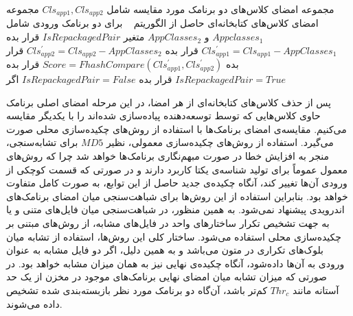  مجموعه امضای کلاس‌های دو برنامک مورد مقایسه شامل $Cls_{app1},Cls_{app2}$ 
 مجموعه امضای کلاس‌های کتابخانه‌ای حاصل از الگوریتم ~ برای دو برنامک ورودی شامل  $Appclasses_1$ و $AppClasses_2$
 متغیر $IsRepackagedPair$ 
 قرار بده $Cls^{'}_{app1} = Cls_{app1} - AppClasses_1$
 قرار بده $Cls^{'}_{app2} = Cls_{app2} - AppClasses_2$
 قرار بده $Score=FhashCompare(Cls^{'}_{app1},Cls^{'}_{app2})$
 قرار بده $IsRepackagedPair=True$
 قرار بده $IsRepackagedPair=False$
‌اگر\\


پس از حذف کلاس‌های کتابخانه‌ای از هر امضا، در این مرحله امضای اصلی برنامک حاوی کلاس‌هایی که توسط توسعه‌دهنده پیاده‌سازی شده‌اند را با یکدیگر مقایسه می‌کنیم. مقایسه‌ی امضای برنامک‌ها با استفاده از روش‌های چکیده‌سازی محلی صورت می‌گیرد. استفاده از روش‌های چکیده‌سازی معمولی، نظیر $MD5$ برای تشابه‌سنجی، منجر به افزایش خطا در صورت مبهم‌نگاری برنامک‌ها خواهد شد چرا که روش‌های معمول عموماً ‌برای تولید شناسه‌ی یکتا کاربرد دارند و در صورتی که قسمت کوچکی از ورودی آن‌ها تغییر کند، آنگاه چکیده‌ی جدید حاصل از این توابع، به صورت کامل متفاوت خواهد بود. بنابراین استفاده از این روش‌ها برای شباهت‌سنجی میان امضای برنامک‌های اندرویدی پیشنهاد نمی‌شود. به همین منظور، در شباهت‌سنجی میان فایل‌های متنی و یا به جهت تشخیص تکرار ساختار‌های واحد در فایل‌های مشابه، از روش‌های مبتنی بر چکیده‌سازی محلی استفاده می‌شود. ساختار کلی این روش‌ها، استفاده از تشابه میان بلوک‌های تکراری در متون می‌باشد و به همین دلیل، اگر دو فایل مشابه به عنوان ورودی به آن‌ها داده‌شود، آنگاه چکیده‌ی نهایی نیز به همان میزان مشابه خواهد بود. در صورتی که میزان تشابه میان امضای نهایی برنامک‌های موجود در مخزن از یک حد آستانه مانند $Thr_c$ کم‌تر باشد، آن‌گاه دو برنامک مورد نظر بازبسته‌بندی شده تشخیص داده می‌شوند. 


















